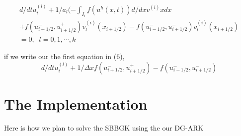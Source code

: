 \documentclass[a4paper,10pt]{article}
\begin{document}
\begin{eqnarray}
 d/dt u_i^{(l)} + 1/a_l(-\int_{I_i} f(u^h(x,t))d/dx v^{(i)}x dx \\ \nonumber
 	+ f(u_{i+1/2}^{-},u_{i+1/2}^{+})v_l^{(i)}(x_{i+1/2}) 
 	- f(u_{i-1/2}^{-},u_{i+1/2}^{-})v_l^{(i)}(x_{i+1/2}) \\ \nonumber
	= 0, \; \;  l = 0,1, \cdots ,k
\end{eqnarray}

if we write our the first equation in (6),
\begin{equation}
 d/dt u_i^{(l)} + 1/{\Delta x}f(u_{i+1/2}^{-},u_{i+1/2}^{+})
 	- f(u_{i-1/2}^{-},u_{i+1/2}^{-})
\end{equation}

\section{The Implementation}
Here is how we plan to solve the SBBGK using the our DG-ARK
\end{document}
